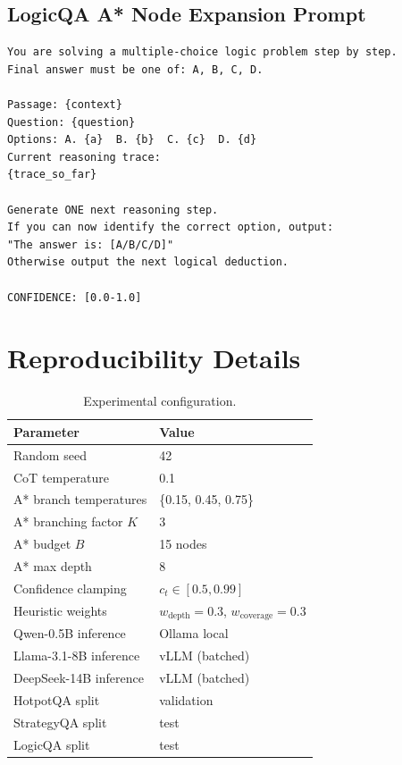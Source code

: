 \documentclass{article}
\begin{document}
\subsection{LogicQA A* Node Expansion Prompt}
\begin{verbatim}
You are solving a multiple-choice logic problem step by step.
Final answer must be one of: A, B, C, D.

Passage: {context}
Question: {question}
Options: A. {a}  B. {b}  C. {c}  D. {d}
Current reasoning trace:
{trace_so_far}

Generate ONE next reasoning step.
If you can now identify the correct option, output:
"The answer is: [A/B/C/D]"
Otherwise output the next logical deduction.

CONFIDENCE: [0.0-1.0]
\end{verbatim}

\section{Reproducibility Details}
\label{app:repro}

\begin{table}[h]
\centering
\caption{Experimental configuration.}
\begin{tabular}{ll}
\toprule
Parameter & Value \\
\midrule
Random seed & 42 \\
CoT temperature & 0.1 \\
A* branch temperatures & \{0.15, 0.45, 0.75\} \\
A* branching factor $K$ & 3 \\
A* budget $B$ & 15 nodes \\
A* max depth & 8 \\
Confidence clamping & $c_t \in [0.5, 0.99]$ \\
Heuristic weights & $w_\text{depth}=0.3$, $w_\text{coverage}=0.3$ \\
\midrule
Qwen-0.5B inference & Ollama local \\
Llama-3.1-8B inference & vLLM (batched) \\
DeepSeek-14B inference & vLLM (batched) \\
HotpotQA split & validation \\
StrategyQA split & test \\
LogicQA split & test \\
\bottomrule
\end{tabular}
\end{table}
\end{document}
